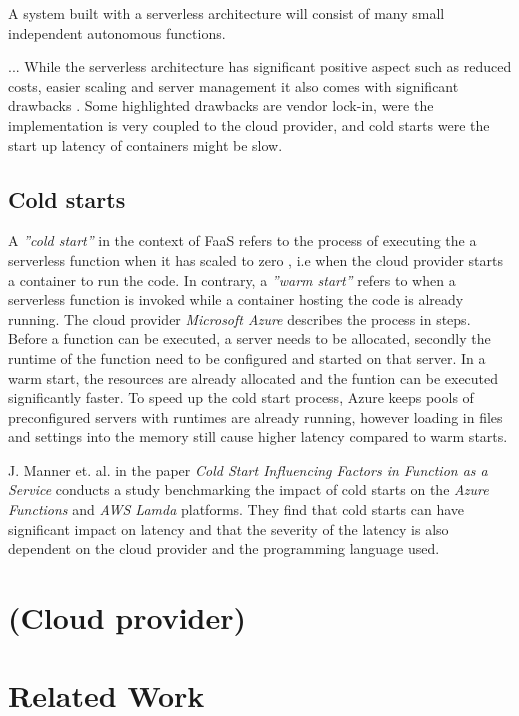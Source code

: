 A system built with a serverless architecture will consist of many small independent autonomous functions.





...
While the serverless architecture has significant positive aspect such as reduced costs, easier scaling and server management it also comes with significant drawbacks \cite{martin_fowler_serverless}. Some highlighted drawbacks are vendor lock-in, were the implementation is very coupled to the cloud provider, and cold starts were the start up latency of containers might be slow. 
\subsection{Cold starts}
A \textit{''cold start''} in the context of FaaS refers to the process of executing the a serverless function when it has scaled to zero \cite{serverless_computing_current_trends}, i.e when the cloud provider starts a container to run the code. In contrary, a \textit{''warm start''} refers to when a serverless function is invoked while a container hosting the code is already running. The cloud provider \textit{Microsoft Azure} \cite{azure_understanding_serverless_cold_start} describes the process in steps. Before a function can be executed, a server needs to be allocated, secondly the runtime of the function need to be configured and started on that server. In a warm start, the resources are already allocated and the funtion can be executed significantly faster. To speed up the cold start process, Azure keeps pools of preconfigured servers with runtimes are already running, however loading in files and settings into the memory still cause higher latency compared to warm starts. 

J. Manner et. al. in the paper \textit{Cold Start Influencing Factors in Function as a Service} \cite{cold_start_influencing_factors_in_FaaS} conducts a study benchmarking the impact of cold starts on the \textit{Azure Functions }and \textit{ AWS Lamda } platforms. They find that cold starts can have significant impact on latency and that the severity of the latency is also dependent on the cloud provider and the programming language used. 


\section{(Cloud provider)}


\section{Related Work}